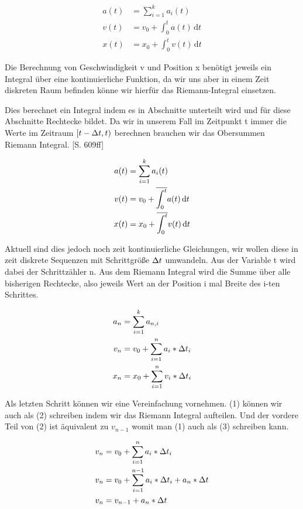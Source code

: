 \begin{align*}
  a(t) &= \sum_{i=1}^{k}{a_i(t)}  \\
  v(t) &= v_0 + \int_0^t {a(t)}\,\mathrm{d}t  \\
  x(t) &= x_0 + \int_0^t {v(t)}\,\mathrm{d}t
\end{align*}

Die Berechnung von Geschwindigkeit v und Position x benötigt jeweils ein Integral über eine kontinuierliche Funktion, da wir uns aber in einem Zeit diskreten Raum befinden könne wir hierfür das Riemann-Integral einsetzen\cite{RINT}.


Dies berechnet ein Integral indem es in Abschnitte unterteilt wird und für diese Abschnitte Rechtecke bildet. Da wir in unserem Fall im Zeitpunkt t immer die Werte im Zeitraum $[t - \Delta t , t)$ berechnen brauchen wir das Obersummen Riemann Integral. \cite{EMFGAIA}[S. 609ff]

\begin{align*}
  a(t) &= \sum_{i=1}^{k}{a_i(t)}  \\
  v(t) &= v_0 + \overline{\int_{0}^{t}} a(t)\,\mathrm{d}t  \\
  x(t) &= x_0 + \overline{\int_{0}^{t}} v(t)\,\mathrm{d}t
\end{align*}

Aktuell sind dies jedoch noch zeit kontinuierliche Gleichungen, wir wollen diese in zeit diskrete Sequenzen mit Schrittgröße $\Delta t$ umwandeln. Aus der Variable t wird dabei der Schrittzähler n. Aus dem Riemann Integral wird die Summe über alle bisherigen Rechtecke, also jeweils Wert an der Position i mal Breite des i-ten Schrittes.

\begin{align*}
  a_n &= \sum_{i=1}^{k}{a_{n, i}}  \\
  v_n &= v_0 + \sum_{i=1}^{n}{a_i * \Delta t_i}  \\
  x_n &= x_0 + \sum_{i=1}^{n}{v_i * \Delta t_i}
\end{align*}

Als letzten Schritt können wir eine Vereinfachung vornehmen. (1) können wir auch als (2) schreiben indem wir das Riemann Integral aufteilen. Und der vordere Teil von (2) ist äquivalent zu $v_{n-1}$ womit man (1) auch als (3) schreiben kann. 

\begin{align}
  v_n &= v_0 + \sum_{i=1}^{n}{a_i * \Delta t_i}  \\
  v_n &= v_0 + \sum_{i=1}^{n-1}{a_i * \Delta t_i} + a_n * \Delta t  \\
  v_n &= v_{n-1} + a_n * \Delta t
\end{align}

